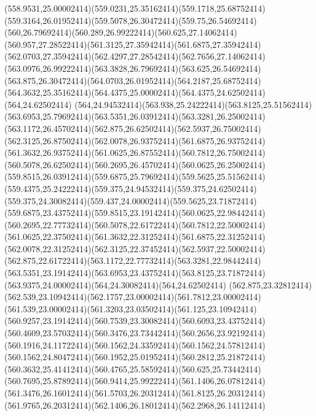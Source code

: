 {{	\curveto(558.9531,25.00002414)(559.0231,25.35162414)(559.1718,25.68752414)
	\curveto(559.3164,26.01952414)(559.5078,26.30472414)(559.75,26.54692414)
	\curveto(560,26.79692414)(560.289,26.99222414)(560.625,27.14062414)
	\curveto(560.957,27.28522414)(561.3125,27.35942414)(561.6875,27.35942414)
	\curveto(562.0703,27.35942414)(562.4297,27.28542414)(562.7656,27.14062414)
	\curveto(563.0976,26.99222414)(563.3828,26.79692414)(563.625,26.54692414)
	\curveto(563.875,26.30472414)(564.0703,26.01952414)(564.2187,25.68752414)
	\curveto(564.3632,25.35162414)(564.4375,25.00002414)(564.4375,24.62502414)
	\closepath
	\moveto(564,24.62502414)
	\curveto(564,24.94532414)(563.938,25.24222414)(563.8125,25.51562414)
	\curveto(563.6953,25.79692414)(563.5351,26.03912414)(563.3281,26.25002414)
	\curveto(563.1172,26.45702414)(562.875,26.62502414)(562.5937,26.75002414)
	\curveto(562.3125,26.87502414)(562.0078,26.93752414)(561.6875,26.93752414)
	\curveto(561.3632,26.93752414)(561.0625,26.87552414)(560.7812,26.75002414)
	\curveto(560.5078,26.62502414)(560.2695,26.45702414)(560.0625,26.25002414)
	\curveto(559.8515,26.03912414)(559.6875,25.79692414)(559.5625,25.51562414)
	\curveto(559.4375,25.24222414)(559.375,24.94532414)(559.375,24.62502414)
	\curveto(559.375,24.30082414)(559.437,24.00002414)(559.5625,23.71872414)
	\curveto(559.6875,23.43752414)(559.8515,23.19142414)(560.0625,22.98442414)
	\curveto(560.2695,22.77732414)(560.5078,22.61722414)(560.7812,22.50002414)
	\curveto(561.0625,22.37502414)(561.3632,22.31252414)(561.6875,22.31252414)
	\curveto(562.0078,22.31252414)(562.3125,22.37452414)(562.5937,22.50002414)
	\curveto(562.875,22.61722414)(563.1172,22.77732414)(563.3281,22.98442414)
	\curveto(563.5351,23.19142414)(563.6953,23.43752414)(563.8125,23.71872414)
	\curveto(563.9375,24.00002414)(564,24.30082414)(564,24.62502414)
	\closepath
	\moveto(562.875,23.32812414)
	\curveto(562.539,23.10942414)(562.1757,23.00002414)(561.7812,23.00002414)
	\curveto(561.539,23.00002414)(561.3203,23.03502414)(561.125,23.10942414)
	\curveto(560.9257,23.19142414)(560.7539,23.30082414)(560.6093,23.43752414)
	\curveto(560.4609,23.57032414)(560.3476,23.73442414)(560.2656,23.92192414)
	\curveto(560.1916,24.11722414)(560.1562,24.33592414)(560.1562,24.57812414)
	\curveto(560.1562,24.80472414)(560.1952,25.01952414)(560.2812,25.21872414)
	\curveto(560.3632,25.41412414)(560.4765,25.58592414)(560.625,25.73442414)
	\curveto(560.7695,25.87892414)(560.9414,25.99222414)(561.1406,26.07812414)
	\curveto(561.3476,26.16012414)(561.5703,26.20312414)(561.8125,26.20312414)
	\curveto(561.9765,26.20312414)(562.1406,26.18012414)(562.2968,26.14112414)
}}
